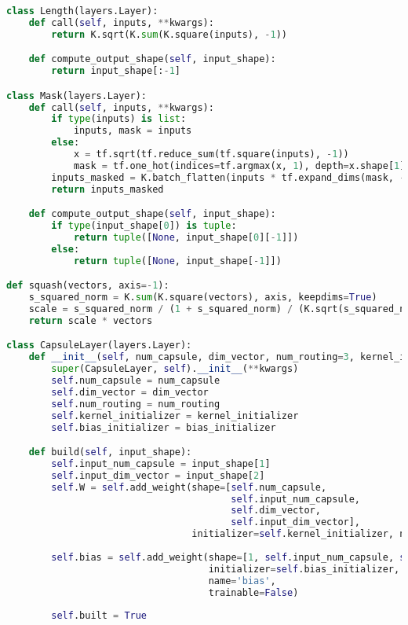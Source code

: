 \begin{lstlisting}[language=Python]
class Length(layers.Layer):
    def call(self, inputs, **kwargs):
        return K.sqrt(K.sum(K.square(inputs), -1))

    def compute_output_shape(self, input_shape):
        return input_shape[:-1]

class Mask(layers.Layer):
    def call(self, inputs, **kwargs):
        if type(inputs) is list:
            inputs, mask = inputs
        else:
            x = tf.sqrt(tf.reduce_sum(tf.square(inputs), -1))
            mask = tf.one_hot(indices=tf.argmax(x, 1), depth=x.shape[1])
        inputs_masked = K.batch_flatten(inputs * tf.expand_dims(mask, -1))
        return inputs_masked

    def compute_output_shape(self, input_shape):
        if type(input_shape[0]) is tuple:
            return tuple([None, input_shape[0][-1]])
        else:
            return tuple([None, input_shape[-1]])

def squash(vectors, axis=-1):
    s_squared_norm = K.sum(K.square(vectors), axis, keepdims=True)
    scale = s_squared_norm / (1 + s_squared_norm) / (K.sqrt(s_squared_norm))
    return scale * vectors

class CapsuleLayer(layers.Layer):
    def __init__(self, num_capsule, dim_vector, num_routing=3, kernel_initializer='glorot_uniform', bias_initializer="zeros", **kwargs):
        super(CapsuleLayer, self).__init__(**kwargs)
        self.num_capsule = num_capsule
        self.dim_vector = dim_vector
        self.num_routing = num_routing
        self.kernel_initializer = kernel_initializer
        self.bias_initializer = bias_initializer

    def build(self, input_shape):
        self.input_num_capsule = input_shape[1]
        self.input_dim_vector = input_shape[2]
        self.W = self.add_weight(shape=[self.num_capsule, 
                                        self.input_num_capsule, 
                                        self.dim_vector, 
                                        self.input_dim_vector], 
                                 initializer=self.kernel_initializer, name='w')
        
        self.bias = self.add_weight(shape=[1, self.input_num_capsule, self.num_capsule, 1, 1],
                                    initializer=self.bias_initializer,
                                    name='bias',
                                    trainable=False)
        
        self.built = True


\end{lstlisting}
